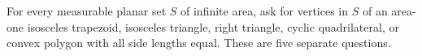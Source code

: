For every measurable planar set $S$ of infinite area, ask for vertices in $S$ of an area-one isosceles trapezoid, isosceles triangle, right triangle, cyclic quadrilateral, or convex polygon with all side lengths equal. These are five separate questions.
